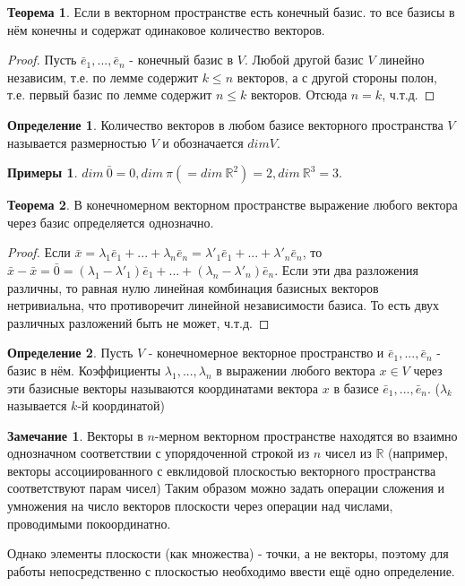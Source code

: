 \documentclass[a4paper, 12pt]{article}
\theoremstyle{definition}
\newtheorem*{definition}{Определение}
\newtheorem*{theorem}{Теорема}
\newtheorem*{remark}{Замечание}
\newtheorem*{examples}{Примеры}
\begin{document}
	\begin{theorem}
		Если в векторном пространстве есть конечный базис. то все базисы в нём конечны и содержат одинаковое количество векторов.
	\end{theorem}
	\begin{proof}
		Пусть $\bar{e}_{1},...,\bar{e}_{n}$ - конечный базис в $V$. Любой другой базис $V$ линейно независим, т.е. по лемме содержит $k \leqslant n$ векторов, а с другой стороны полон, т.е. первый базис по лемме содержит $n \leqslant k$ векторов. Отсюда $n=k$, ч.т.д.
	\end{proof}
	\begin{definition}
		Количество векторов в любом базисе векторного пространства $V$ называется размерностью $V$ и обозначается $dim V$.
	\end{definition}
	\begin{examples}
		$dim \ {\bar{0}} = 0, dim \ \pi (= dim \ \mathbb{R}^2) = 2, dim \ \mathbb{R}^3 = 3$.
	\end{examples}
	\begin{theorem}
		В конечномерном векторном пространстве выражение любого вектора через базис определяется однозначно.
	\end{theorem}
	\begin{proof}
		Если $\bar{x} = \lambda_{1}\bar{e}_{1} + ... + \lambda_{n}\bar{e}_{n} = \lambda'_{1}\bar{e}_{1} + ... + \lambda'_{n}\bar{e}_{n}$, то $\bar{x} - \bar{x} = \bar{0} = (\lambda_{1} - \lambda'_{1})\bar{e}_{1} + ... + (\lambda_{n} - \lambda'_n)\bar{e}_{n}$. Если эти два разложения различны, то равная нулю линейная комбинация базисных векторов нетривиальна, что противоречит линейной независимости базиса. То есть двух различных разложений быть не может, ч.т.д. 
	\end{proof}
	\begin{definition}
		Пусть $V$ - конечномерное векторное пространство и $\bar{e}_{1},...,\bar{e}_{n}$ - базис в нём. Коэффициенты $\lambda_{1},...,\lambda_{n}$ в выражении любого вектора $x \in V$ через эти базисные векторы называются координатами вектора $x$ в базисе $\bar{e}_{1},...,\bar{e}_{n}$. ($\lambda_{k}$  называется $k$-й координатой)
	\end{definition}
	\begin{remark}
		Векторы в $n$-мерном векторном пространстве находятся во взаимно однозначном соответствии с упорядоченной строкой из $n$ чисел из $\mathbb{R}$ (например, векторы ассоциированного с евклидовой плоскостью векторного пространства соответствуют парам чисел)
		Таким образом можно задать операции сложения и умножения на число векторов плоскости через операции над числами, проводимыми покоординатно.
	\end{remark}
	Однако элементы плоскости (как множества) - точки, а не векторы, поэтому для работы непосредственно с плоскостью необходимо ввести ещё одно определение.
\end{document}
